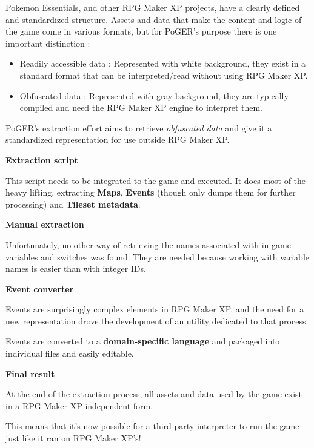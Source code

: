 \documentclass[11pt]{article}
\begin{document}
{Pokemon Essentials, and other RPG Maker XP projects, have a clearly defined and standardized structure. Assets and data that make the content and logic of the game come in various formats, but for PoGER's purpose there is one important distinction :

\begin{itemize}
	\item Readily accessible data : Represented with white background, they exist in a standard format that can be interpreted/read without using RPG Maker XP.
	
	\item Obfuscated data : Represented with gray background, they are typically compiled and need the RPG Maker XP engine to interpret them.
\end{itemize}

PoGER's extraction effort aims to retrieve \textit{obfuscated data} and give it a standardized representation for use outside RPG Maker XP.

\vspace{2mm}
\textbf{Extraction script}

This script needs to be integrated to the game and executed. It does most of the heavy lifting, extracting \textbf{Maps}, \textbf{Events} (though only dumps them for further processing) and \textbf{Tileset metadata}.

\vspace{2mm}
\textbf{Manual extraction}

Unfortunately, no other way of retrieving the names associated with in-game variables and switches was found. They are needed because working with variable names is easier than with integer IDs.

\vspace{2mm}
\textbf{Event converter}

Events are surprisingly complex elements in RPG Maker XP, and the need for a new representation drove the development of an utility dedicated to that process.

Events are converted to a \textbf{domain-specific language} and packaged into individual files and easily editable.

\vspace{2mm}
\textbf{Final result}

At the end of the extraction process, all assets and data used by the game exist in a RPG Maker XP-independent form.

This means that it's now possible for a third-party interpreter to run the game just like it ran on RPG Maker XP's!

}
\end{document}
